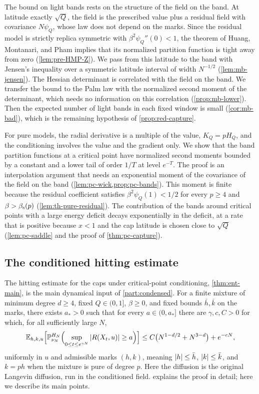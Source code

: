 The bound on light bands rests on the structure of the field on the band. At latitude exactly $\sqrt Q$, the field is the prescribed value plus a residual field with covariance $N\psi_Q$, whose law does not depend on the marks. Since the residual model is strictly replica symmetric with $\beta^2\psi_Q''(0)<1$, the theorem of Huang, Montanari, and Pham \cite[Lemma~3.2 and Remark~3.3]{HuangMontanariPham2024} implies that its normalized partition function is tight away from zero (\cref{lem:pre-HMP-Z}). We pass from this latitude to the band with Jensen's inequality over a symmetric latitude interval of width $N^{-1/2}$ (\cref{lem:mb-jensen}). The Hessian determinant is correlated with the field on the band. We transfer the bound to the Palm law with the normalized second moment of the determinant, which needs no information on this correlation (\cref{prop:mb-lower}). Then the expected number of light bands in each fixed window is small (\cref{cor:mb-bad}), which is the remaining hypothesis of \cref{prop:red-capture}.

For pure models, the radial derivative is a multiple of the value, $K_Q=pH_Q$, and the conditioning involves the value and the gradient only. We show that the band partition functions at a critical point have normalized second moments bounded by a constant and a lower tail of order $1/T$ at level $e^{-T}$. The proof is an interpolation argument that needs an exponential moment of the covariance of the field on the band (\cref{lem:pc-wick,prop:pc-bands}). This moment is finite because the residual coefficient satisfies $\beta^2\psi_Q(1)<1/2$ for every $p\ge4$ and $\beta>\beta_{\mathrm s}(p)$ (\cref{lem:th-pure-residual}). The contribution of the bands around critical points with a large energy deficit decays exponentially in the deficit, at a rate that is positive because $x<1$ and the cap latitude is chosen close to $\sqrt Q$ (\cref{lem:pc-saddle} and the proof of \cref{thm:pc-capture}).

\subsection{The conditioned hitting estimate}\label{sec:ov-entrance}

The hitting estimate for the caps under critical-point conditioning, \cref{thm:ent-main}, is the main dynamical input of \cref{part:condensed}. For a finite mixture of minimum degree $d\ge4$, fixed $Q\in(0,1]$, $\beta\ge0$, and fixed bounds $\bar h,\bar k$ on the marks, there exists $a_*>0$ such that for every $a\in(0,a_*]$ there are $\gamma,c,C>0$ for which, for all sufficiently large $N$,
\begin{equation}\label{eq:ov-entrance}
\mathbb E_{h,k,u}\Bigl[\mathbb P^{H_N}_{\nu_N}\Bigl(\sup_{0\le t\le e^{\gamma N}}\left|R(X_t,u)\right|\ge a\Bigr)\Bigr]\le C\bigl(N^{1-d/2}+N^{3-d}\bigr)+e^{-cN},
\end{equation}
uniformly in $u$ and admissible marks $(h,k)$, meaning $\left|h\right|\le\bar h$, $\left|k\right|\le\bar k$, and $k=ph$ when the mixture is pure of degree $p$. Here the diffusion is the original Langevin diffusion, run in the conditioned field.  explains the proof in detail; here we describe its main points.

